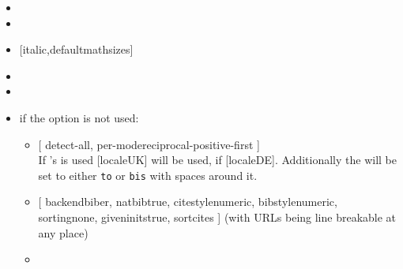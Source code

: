 \begin{multicols}{2}
\begin{itemize}[leftmargin=10pt]
    \item {}
    \item {}
    \item {} [italic,defaultmathsizes]
    \item {}
    \item {}
    \item if the  option is not used:
      \begin{itemize}
        \item {}
          [%
            detect-all,
            per-mode\Seq reciprocal-positive-first%
          ]\\
          If 's  is used [locale\Seq UK] will be used,
          if  [locale\Seq DE]. Additionally the 
          will be set to either \texttt{to} or \texttt{bis} with spaces around
          it.
        \item {}
          [%
            backend\Seq biber, natbib\Seq true, citestyle\Seq numeric,
            bibstyle\Seq numeric, sorting\Seq none, giveninits\Seq true,
            sortcites%
          ] (with URLs being line breakable at any place)
        \item {}
      \end{itemize}
  \end{itemize}
\end{multicols}%
